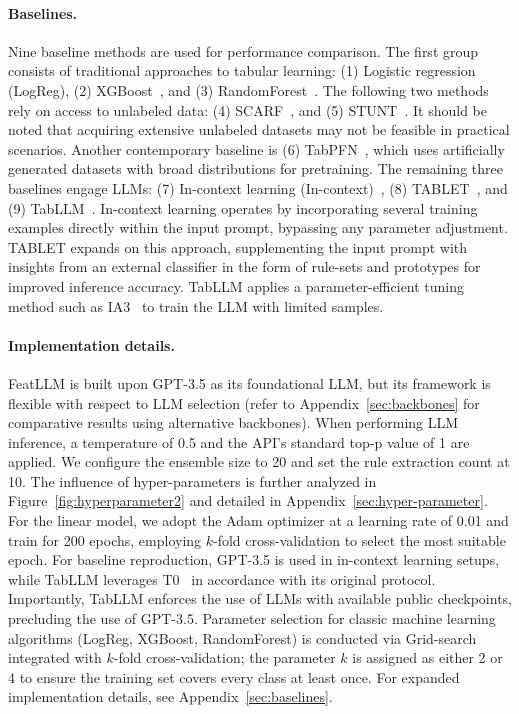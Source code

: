 \vspace*{-0.12in}
\paragraph{Baselines.}
Nine baseline methods are used for performance comparison. The first group consists of traditional approaches to tabular learning: (1) Logistic regression (LogReg), (2) XGBoost~\cite{chen2016xgboost}, and (3) RandomForest~\cite{ho1995random}. The following two methods rely on access to unlabeled data: (4) SCARF~\cite{bahri2022scarf}, and (5) STUNT~\cite{nam2023stunt}. It should be noted that acquiring extensive unlabeled datasets may not be feasible in practical scenarios. Another contemporary baseline is (6) TabPFN~\cite{hollmann2022tabpfn}, which uses artificially generated datasets with broad distributions for pretraining. The remaining three baselines engage LLMs: (7) In-context learning (In-context)~\cite{wei2022emergent}, (8) TABLET~\cite{slack2023tablet}, and (9) TabLLM~\cite{hegselmann2023tabllm}. In-context learning operates by incorporating several training examples directly within the input prompt, bypassing any parameter adjustment. TABLET expands on this approach, supplementing the input prompt with insights from an external classifier in the form of rule-sets and prototypes for improved inference accuracy. TabLLM applies a parameter-efficient tuning method such as IA3~\cite{liu2022few} to train the LLM with limited samples.

\vspace*{-0.12in}
\paragraph{Implementation details.}
\textsf{FeatLLM} is built upon GPT-3.5 as its foundational LLM, but its framework is flexible with respect to LLM selection (refer to Appendix~\ref{sec:backbones} for comparative results using alternative backbones). When performing LLM inference, a temperature of 0.5 and the API's standard top-p value of 1 are applied. We configure the ensemble size to 20 and set the rule extraction count at 10. The influence of hyper-parameters is further analyzed in Figure~\ref{fig:hyperparameter2} and detailed in Appendix~\ref{sec:hyper-parameter}.
For the linear model, we adopt the Adam optimizer at a learning rate of 0.01 and train for 200 epochs, employing $k$-fold cross-validation to select the most suitable epoch. For baseline reproduction, GPT-3.5 is used in in-context learning setups, while TabLLM leverages T0~\cite{sanh2022multitask} in accordance with its original protocol. Importantly, TabLLM enforces the use of LLMs with available public checkpoints, precluding the use of GPT-3.5. Parameter selection for classic machine learning algorithms (LogReg, XGBoost, RandomForest) is conducted via Grid-search integrated with $k$-fold cross-validation; the parameter $k$ is assigned as either 2 or 4 to ensure the training set covers every class at least once. For expanded implementation details, see Appendix~\ref{sec:baselines}.

